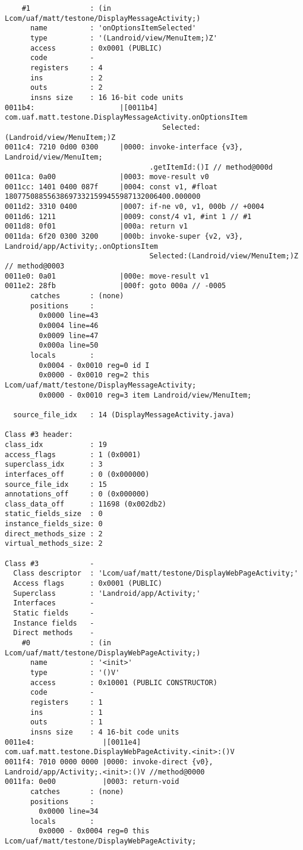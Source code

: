 \begin{lstlisting}
    #1              : (in Lcom/uaf/matt/testone/DisplayMessageActivity;)
      name          : 'onOptionsItemSelected'
      type          : '(Landroid/view/MenuItem;)Z'
      access        : 0x0001 (PUBLIC)
      code          -
      registers     : 4
      ins           : 2
      outs          : 2
      insns size    : 16 16-bit code units
0011b4:                    |[0011b4] com.uaf.matt.testone.DisplayMessageActivity.onOptionsItem
                                     Selected:(Landroid/view/MenuItem;)Z
0011c4: 7210 0d00 0300     |0000: invoke-interface {v3}, Landroid/view/MenuItem;
                                  .getItemId:()I // method@000d
0011ca: 0a00               |0003: move-result v0
0011cc: 1401 0400 087f     |0004: const v1, #float 180775088556386973321599455987132006400.000000
0011d2: 3310 0400          |0007: if-ne v0, v1, 000b // +0004
0011d6: 1211               |0009: const/4 v1, #int 1 // #1
0011d8: 0f01               |000a: return v1
0011da: 6f20 0300 3200     |000b: invoke-super {v2, v3}, Landroid/app/Activity;.onOptionsItem
                                  Selected:(Landroid/view/MenuItem;)Z // method@0003
0011e0: 0a01               |000e: move-result v1
0011e2: 28fb               |000f: goto 000a // -0005
      catches       : (none)
      positions     :
        0x0000 line=43
        0x0004 line=46
        0x0009 line=47
        0x000a line=50
      locals        :
        0x0004 - 0x0010 reg=0 id I
        0x0000 - 0x0010 reg=2 this Lcom/uaf/matt/testone/DisplayMessageActivity;
        0x0000 - 0x0010 reg=3 item Landroid/view/MenuItem;

  source_file_idx   : 14 (DisplayMessageActivity.java)

Class #3 header:
class_idx           : 19
access_flags        : 1 (0x0001)
superclass_idx      : 3
interfaces_off      : 0 (0x000000)
source_file_idx     : 15
annotations_off     : 0 (0x000000)
class_data_off      : 11698 (0x002db2)
static_fields_size  : 0
instance_fields_size: 0
direct_methods_size : 2
virtual_methods_size: 2

Class #3            -
  Class descriptor  : 'Lcom/uaf/matt/testone/DisplayWebPageActivity;'
  Access flags      : 0x0001 (PUBLIC)
  Superclass        : 'Landroid/app/Activity;'
  Interfaces        -
  Static fields     -
  Instance fields   -
  Direct methods    -
    #0              : (in Lcom/uaf/matt/testone/DisplayWebPageActivity;)
      name          : '<init>'
      type          : '()V'
      access        : 0x10001 (PUBLIC CONSTRUCTOR)
      code          -
      registers     : 1
      ins           : 1
      outs          : 1
      insns size    : 4 16-bit code units
0011e4:                |[0011e4] com.uaf.matt.testone.DisplayWebPageActivity.<init>:()V
0011f4: 7010 0000 0000 |0000: invoke-direct {v0}, Landroid/app/Activity;.<init>:()V //method@0000
0011fa: 0e00           |0003: return-void
      catches       : (none)
      positions     :
        0x0000 line=34
      locals        :
        0x0000 - 0x0004 reg=0 this Lcom/uaf/matt/testone/DisplayWebPageActivity;


\end{lstlisting}
